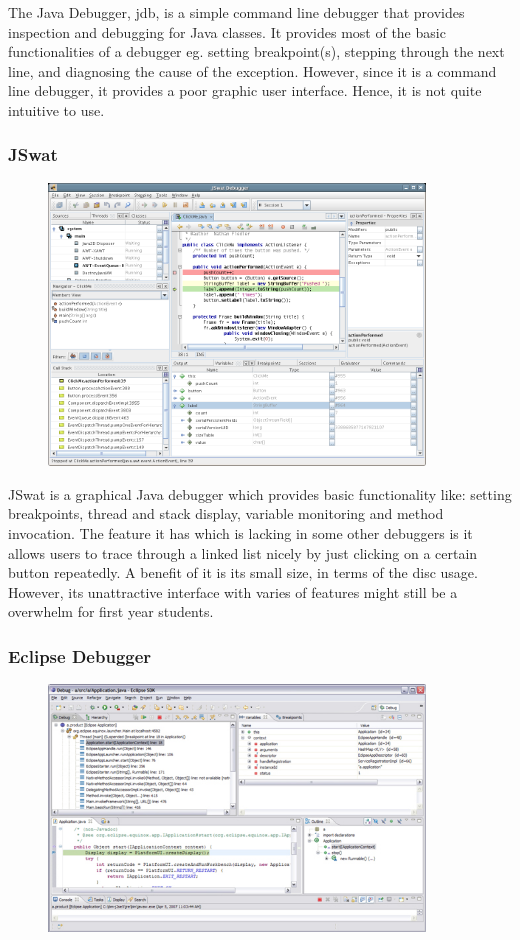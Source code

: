 \documentclass[11pt, a4paper]{article}
\begin{document}
The Java Debugger, jdb, is a simple command line debugger that provides inspection and debugging for Java classes.
It provides most of the basic functionalities of a debugger eg. setting breakpoint(s), stepping through the next line, and diagnosing the cause of the exception.
However, since it is a command line debugger, it provides a poor graphic user interface.
Hence, it is not quite intuitive to use.
\subsubsection{JSwat}
\begin{figure}[h!]
\centering
\includegraphics[width=100mm]{jswat.png}
\end{figure}

JSwat is a graphical Java debugger which provides basic functionality like: setting breakpoints, thread and stack display, variable monitoring and method invocation.
The feature it has which is lacking in some other debuggers is it allows users to trace through a linked list nicely by just clicking on a certain button repeatedly.
A benefit of it is its small size, in terms of the disc usage.
However, its unattractive interface with varies of features might still be a overwhelm for first year students.
\subsubsection{Eclipse Debugger}
\begin{figure}[h!]
\centering
\includegraphics[width=100mm]{eclipse.jpg}
\end{figure}
\end{document}

